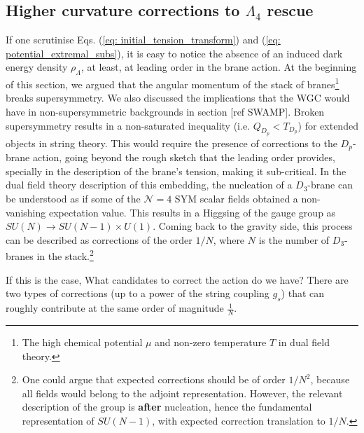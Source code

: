 \subsection{Higher curvature corrections to $\Lambda_{4}$ rescue}

If one scrutinise Eqs. (\ref{eq: initial_tension_transform}) and (\ref{eq: potential_extremal_subs}), it is easy to notice the absence of an induced dark energy density $\rho_{\Lambda}$, at least, at leading order in the brane action. At the beginning of this section, we argued that the angular momentum of the stack of branes\footnote{The high chemical potential $\mu$ and non-zero temperature $T$ in dual field theory.} breaks supersymmetry. We also discussed the implications that the WGC would have in non-supersymmetric backgrounds in section [ref SWAMP]. Broken supersymmetry results in a non-saturated inequality (i.e. $Q_{D_{p}} < T_{D_{p}}$) for extended objects in string theory. This would require the presence of corrections to the $D_{p}$-brane action, going beyond the rough sketch that the leading order provides, specially in the description of the brane's tension, making it sub-critical. In the dual field theory description of this embedding, the nucleation of a $D_3$-brane can be understood as if some of the $\mathcal{N}= 4$ SYM scalar fields obtained a non-vanishing expectation value. This results in a Higgsing of the gauge group as $SU(N) \rightarrow SU(N-1) \times U(1)$. Coming back to the gravity side, this process can be described as corrections of the order $1/N$, where $N$ is the number of $D_{3}$-branes in the stack.\footnote{One could argue that expected corrections should be of order $1/N^{2}$, because all fields would belong to the adjoint representation. However, the relevant description of the group is \textbf{after} nucleation, hence the fundamental representation of $SU(N-1)$, with expected correction translation to $1/N$.}

If this is the case, What candidates to correct the action do we have? There are two types of corrections (up to a power of the string coupling $g_{s}$) that can roughly contribute at the same order of magnitude $\tfrac{1}{N}$.

